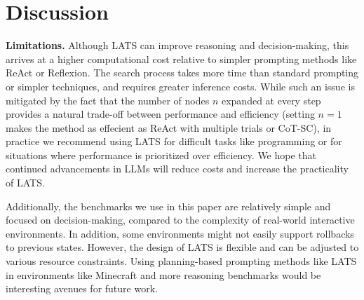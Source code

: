 \documentclass{article} \usepackage{iclr2024_conference,times}
\begin{document}
\section{Discussion}
\label{sec:discussion}
\textbf{Limitations.} Although LATS can improve reasoning and decision-making, this arrives at a higher computational cost {relative to simpler prompting methods like ReAct or Reflexion}. The search process takes more time than standard prompting or simpler techniques, and requires greater inference costs. {While such an issue is mitigated by the fact that the number of nodes $n$ expanded at every step provides a natural trade-off between performance and efficiency (setting $n=1$ makes the method as effecient as ReAct with multiple trials or CoT-SC)}, in practice we recommend using LATS for difficult tasks like programming or for situations where performance is prioritized over efficiency. We hope that continued advancements in LLMs will reduce costs and increase the practicality of LATS.

{
Additionally, the benchmarks we use in this paper are relatively simple and focused on decision-making, compared to the complexity of real-world interactive environments. In addition, some environments might not easily support rollbacks to previous states. However, the design of LATS is flexible and can be adjusted to various resource constraints. Using planning-based prompting methods like LATS in environments like Minecraft \citep{fan2022minedojo} and more reasoning benchmarks would be interesting avenues for future work. 
}
\end{document}
